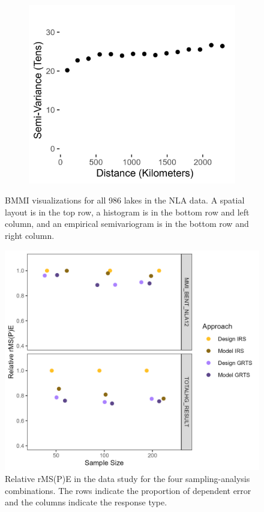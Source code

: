 \documentclass[]{elsarticle} %
\begin{document}
\begin{figure}
\begin{subfigure}{0.49\textwidth}
  \caption*{}
  \label{fig:bmmi_hist}
\end{subfigure}
\begin{subfigure}{0.49\textwidth}
  \centering
  \includegraphics[width = 1\linewidth]{figures/bmmi_sv_plot.jpeg}
  \caption*{}
  \label{fig:bmmi_sv_plot}
\end{subfigure}
\caption{BMMI visualizations for all 986 lakes in the NLA data. A spatial layout is in the top row, a histogram is in the bottom row and left column, and an empirical semivariogram is in the bottom row and right column.}
\label{fig:merc}
\end{figure}

\begin{figure}
  \centering
  \includegraphics[width = 1\linewidth]{figures/data_rmspe_eff.jpeg}
  \caption{Relative rMS(P)E in the data study for the four sampling-analysis combinations. The rows indicate the proportion of dependent error and the columns indicate the response type.}
  \label{fig:rmspe_eff}
\end{figure}
\end{document}
